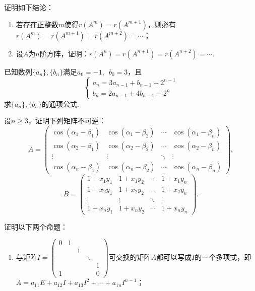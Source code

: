 \begin{exercise}
\begin{exgroup}
        \item 证明如下结论：
        \begin{enumerate}
            \item 若存在正整数$m$使得$r(A^m)=r(A^{m+1})$，则必有$r(A^m)=r(A^{m+1})=r(A^{m+2})=\cdots$；
            \item 设$A$为$n$阶方阵，证明：$r(A^n)=r(A^{n+1})=r(A^{n+2})=\cdots$.
        \end{enumerate}
    \end{exgroup}

    \begin{exgroup}
        \item 已知数列$\{a_n\},\{b_n\}$满足$a_0=-1,\enspace b_0=3$，且
        \[\begin{cases}
                a_n=3a_{n-1}+b_{n-1}+2^{n-1} \\
                b_n=2a_{n-1}+4b_{n-1}+2^n
            \end{cases}\]
        求$\{a_n\},\{b_n\}$的通项公式.

        \item 设$n\geqslant 3$，证明下列矩阵不可逆：
        \[A=\begin{pmatrix}
                \cos(\alpha_1-\beta_1) & \cos(\alpha_1-\beta_2) & \cdots & \cos(\alpha_1-\beta_n) \\
                \cos(\alpha_2-\beta_1) & \cos(\alpha_2-\beta_2) & \cdots & \cos(\alpha_2-\beta_n) \\
                \vdots                 & \vdots                 & \ddots & \vdots                 \\
                \cos(\alpha_n-\beta_1) & \cos(\alpha_n-\beta_2) & \cdots & \cos(\alpha_n-\beta_n)
            \end{pmatrix},\]
        \[B=\begin{pmatrix}
                1+x_1y_1 & 1+x_1y_2 & \cdots & 1+x_1y_n \\
                1+x_2y_1 & 1+x_2y_2 & \cdots & 1+x_2y_n \\
                \vdots   & \vdots   & \ddots & \vdots   \\
                1+x_ny_1 & 1+x_ny_2 & \cdots & 1+x_ny_n
            \end{pmatrix}.\]

        \item 证明以下两个命题：
        \begin{enumerate}
            \item 与矩阵$I=\begin{pmatrix}
                          0 & 1 &   &        &   \\
                            &   & 1 &        &   \\
                            &   &   & \ddots &   \\
                            &   &   &        & 1 \\
                          1 &   &   &        & 0
                      \end{pmatrix}$可交换的矩阵$A$都可以写成$I$的一个多项式，即$A=a_{11}E+a_{12}I+a_{13}I^2+\cdots+a_{1n}I^{n-1}$；


\end{enumerate}
\end{exgroup}
\end{exercise}
